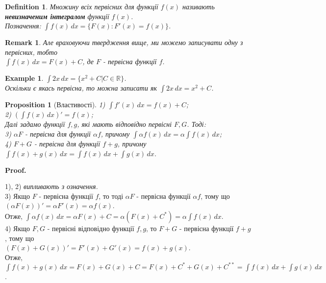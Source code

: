 \documentclass[a4paper, 10pt]{article}
\makeatletter
\def\huge{\displaystyle}
\def\qed{$\blacksquare$}
\theoremstyle{theoremdd}
\theoremstyle{theoremdd}
\theoremstyle{theoremdd}
\newtheorem{definition}[theorem]{Definition}
\theoremstyle{theoremdd}
\theoremstyle{theoremdd}
\newtheorem{example}[theorem]{Example}
\theoremstyle{theoremdd}
\newtheorem{proposition}[theorem]{Proposition}
\theoremstyle{theoremdd}
\newtheorem{remark}[theorem]{Remark}
\theoremstyle{theoremdd}
\theoremstyle{theoremdd}
\renewenvironment{proof}[1][Proof.\\]{\par
\pushQED{\hfill \qed}%
\normalfont \topsep6\p@\@plus6\p@\relax
\trivlist
\item\relax
{\bfseries
#1\@addpunct{.}}\hspace\labelsep\ignorespaces
}{%
\popQED\endtrivlist\@endpefalse
}
\makeatother
\begin{document}
\begin{definition}
Множину всіх первісних для функції $f(x)$ називають \textbf{невизначеним інтегралом} функції $f(x)$.\\
Позначення: $\huge \int f(x) \,dx = \{F(x): F'(x) = f(x)\}$.
\end{definition}

\begin{remark}
Але враховуючи твердження вище, ми можемо записувати одну з первісних, тобто \\
$\huge \int f(x) \,dx = F(x) + C$, де $F$ - первісна функції $f$.
\end{remark}

\begin{example}
$\huge\int 2x \,dx = \{x^2 + C | C \in \mathbb{R}\}$.\\
Оскільки є якась первісна, то можна записати як $\huge\int 2x\,dx = x^2 + C$.
\end{example}

\begin{proposition}[Властивості]
1) $\huge \int f'(x)\,dx = f(x) + C$;\\
2) $\huge \left(\int f(x)\,dx \right)' = f(x)$; \\
Далі задамо функції $f,g$, які мають відповідно первісні $F,G$. Тоді:\\
3) $\alpha F$ - первісна для функції $\alpha f$, причому $\huge \int \alpha f(x)\,dx = \alpha \int f(x)\,dx$;\\
4) $F+G$ - первісна для функції $f+g$, причому $\huge \int f(x) + g(x) \,dx = \int f(x)\,dx + \int g(x)\,dx$.
\end{proposition}

\begin{proof}
1), 2) \textit{випливають з означення.} \bigskip \\
3) Якщо $F$ - первісна функції $f$, то тоді $\alpha F$ - первісна функції $\alpha f$, тому що \\ $(\alpha F(x))' = \alpha F'(x) = \alpha f(x)$. \\ Отже, $\huge\int \alpha f(x) \,dx = \alpha F(x) + C = \alpha \left( F(x) + C^* \right) = \alpha \int f(x)\,dx$. \bigskip \\
4) Якщо $F,G$ - первісні відповідно функції $f,g$, то $F+G$ - первісна функції $f+g$, тому що \\ $(F(x)+G(x))' = F'(x)+G'(x) = f(x)+g(x)$. \\ Отже, $\huge\int f(x)+g(x) \,dx = F(x) + G(x) + C = F(x) + C^* + G(x) + C^{**} = \int f(x)\,dx + \int g(x)\,dx$.
\end{proof}
\end{document}
